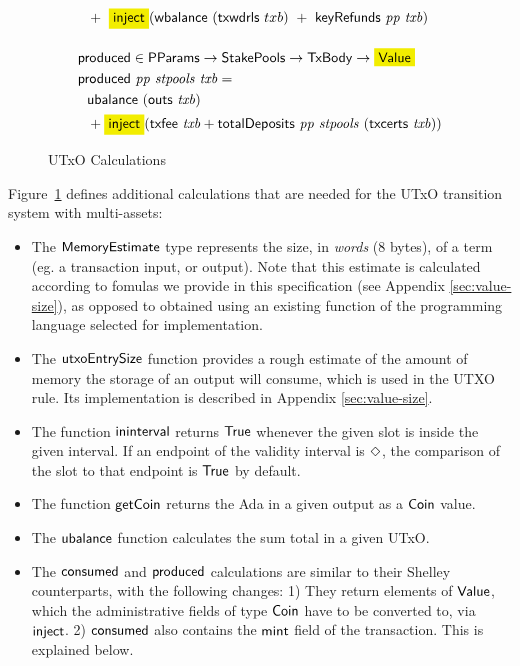 \begin{figure}[htb]
\begin{align*}
    &~~+~\hldiff{\fun{inject}}(\fun{wbalance}~(\fun{txwdrls}~{txb})~+~ \keyRefunds{pp}{txb})
    \nextdef
    & \fun{produced} \in \PParams \to \StakePools \to \TxBody \to \hldiff{\Value} \\
    & \fun{produced}~\var{pp}~\var{stpools}~\var{txb} = \\
    &~~\ubalance{(\fun{outs}~{txb})} \\
    &~~+ \hldiff{\fun{inject}}(\txfee{txb} + \totalDeposits{pp}{stpools}{(\txcerts{txb})})
  \end{align*}
  \caption{UTxO Calculations}
  \label{fig:functions:utxo}
\end{figure}

Figure~\ref{fig:functions:utxo} defines additional calculations that are needed for the
UTxO transition system with multi-assets:

\begin{itemize}
  \item The $\mathsf{MemoryEstimate}$ type represents the size, in \emph{words} (8 bytes), of
  a term (eg. a transaction input, or output). Note that this estimate is calculated
  according to fomulas we provide in this specification (see Appendix \ref{sec:value-size}),
  as opposed to obtained using an existing function of the programming
  language selected for implementation.

  \item The $\mathsf{utxoEntrySize}$ function provides a rough estimate of
    the amount of memory the storage of an output will consume, which is used in the UTXO rule.
    Its implementation is described in Appendix \ref{sec:value-size}.

  \item The function $\mathsf{ininterval}$ returns $\mathsf{True}$ whenever the given slot is
  inside the given interval. If an endpoint of the validity interval
  is $\Diamond$, the comparison of the slot to that endpoint is $\mathsf{True}$ by default.

  \item The function $\mathsf{getCoin}$ returns the Ada in a given output as a $\mathsf{Coin}$ value.

  \item The $\mathsf{ubalance}$ function calculates the sum total in a given UTxO.

  \item The $\mathsf{consumed}$ and $\mathsf{produced}$ calculations are similar to their Shelley
    counterparts, with the following changes: 1) They return elements of $\mathsf{Value}$, which
    the administrative fields of type $\mathsf{Coin}$ have to be converted to, via $\mathsf{inject}$.
    2) $\mathsf{consumed}$ also contains the $\mathsf{mint}$ field of the transaction.
    This is explained below.
\end{itemize}

